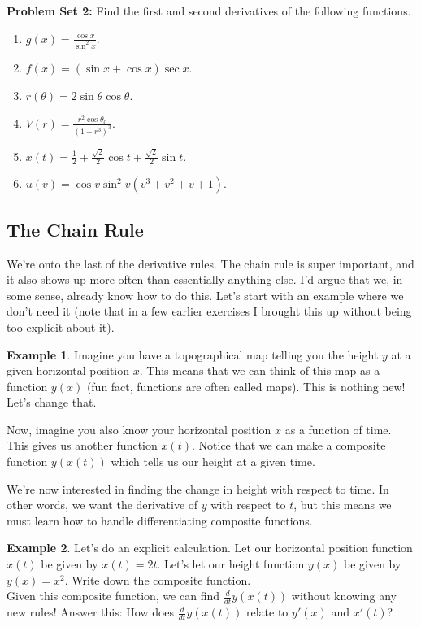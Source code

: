 \documentclass[leqno]{article}
\theoremstyle{definition}
\newtheorem{example}{Example}[section]
\theoremstyle{remark}
\theoremstyle{theorem}
\begin{document}
\noindent \textbf{Problem Set 2:} Find the first and second derivatives of the following functions.
\begin{enumerate}[1.]
\item $g(x)=\frac{\cos x}{\sin^2 x}$.
\item $f(x)=(\sin x + \cos x) \sec x$.
\item $r(\theta)=2\sin \theta \cos \theta$.
\item $V(r)=\frac{r^2 \cos \theta_0}{(1-r^3)^3}$.
\item $x(t)=\frac{1}{2}+\frac{\sqrt{2}}{2}\cos t + \frac{\sqrt{2}}{2} \sin t$.
\item $u(v)=\cos v \sin^2 v (v^3+v^2+v+1)$.
\end{enumerate}

\subsection{The Chain Rule}

We're onto the last of the derivative rules.  The chain rule is super important, and it also shows up more often than essentially anything else.  I'd argue that we, in some sense, already know how to do this.  Let's start with an example where we don't need it (note that in a few earlier exercises I brought this up without being too explicit about it).

\begin{example}
Imagine you have a topographical map telling you the height $y$ at a given horizontal position $x$.  This means that we can think of this map as a function $y(x)$ (fun fact, functions are often called maps).  This is nothing new!  Let's change that.

Now, imagine you also know your horizontal position $x$ as a function of time.  This gives us another function $x(t)$.  Notice that we can make a composite function $y(x(t))$ which tells us our height at a given time.  

We're now interested in finding the change in height with respect to time.  In other words, we want the derivative of $y$ with respect to $t$, but this means we must learn how to handle differentiating composite functions.
\end{example}

\begin{example}
Let's do an explicit calculation.  Let our horizontal position function $x(t)$ be given by $x(t)=2t$.  Let's let our height function $y(x)$ be given by $y(x)=x^2$.  Write down the composite function.
\vspace*{3cm}\\

Given this composite function, we can find $\frac{d}{dt} y(x(t))$ without knowing any new rules! Answer this: How does $\frac{d}{dt} y(x(t))$ relate to $y'(x)$ and $x'(t)$?
\vspace*{4cm}\\
\end{example}
\end{document}
